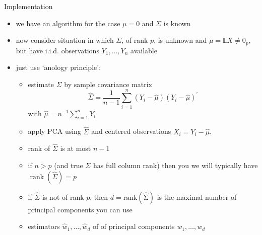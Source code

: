 \documentclass[pdf, handout]{beamer}
\begin{document}
\begin{frame}{Implementation}
\begin{itemize}
\item we have an algorithm for the case $\mu=0$ and $\Sigma$ is known
\item now consider situation in which $\Sigma$, of rank $p$, is unknown and $\mu=\mathbb{E}X\neq 0_p$,  but have i.i.d. observations $Y_1,\dots,Y_n$ available 
\item just use `anology principle': 
\begin{itemize}
\item estimate $\Sigma$ by sample covariance matrix
\[
\hat \Sigma = \frac{1}{n-1} \sum_{i=1}^n (Y_i - \hat{\mu})(Y_i - \hat{\mu})^\prime 
\]
with $\hat{\mu}=n^{-1}\sum_{i=1}^n Y_i$
\item apply PCA using $\hat\Sigma$ and centered observations
$X_i = Y_i - \hat{\mu}$.
\item rank of $\hat\Sigma$ is at most $n-1$
\item if $n>p$ (and true $\Sigma$ has full column rank) then you we will typically have $\operatorname{rank}(\hat\Sigma)=p$
\item if $\hat\Sigma$ is not of rank $p$, then $d=\operatorname{rank(\hat\Sigma)}$ is the maximal number of
principal components you can use
\end{itemize}
\begin{itemize}
\item estimators  $\hat w_1,\dots,\hat w_d$ of of principal components $w_1,\dots,w_d$
\end{itemize}
\end{itemize}
\end{frame}
\end{document}
